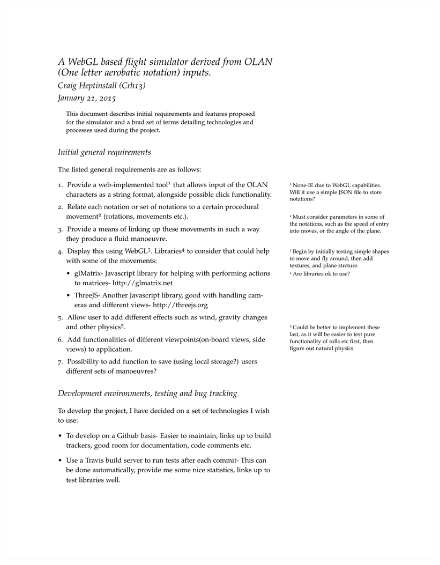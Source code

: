 \begin{figure}[h!]
	\includegraphics[width=18cm,height=18cm,page=2]{images/init.pdf}
\end{figure}
\clearpage

